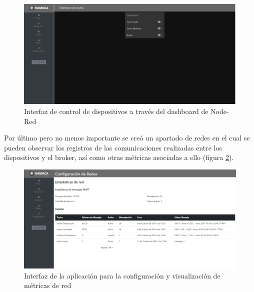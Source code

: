 \begin{figure}[!htb]
\centering
\includegraphics[scale=0.2]{./Figuras/hamaca_home.png}
\caption{Interfaz de control de dispositivos a través del dashboard de Node-Red}
\label{fig:hamaca_home}
\vspace*{-10pt}
\end{figure}

Por último pero no menos importante se creó un apartado de redes en el cual se pueden observar los registros de las comunicaciones realizadas entre los dispositivos y el broker, así como otras métricas asociadas a ello (figura \ref{fig:hamaca_redes}).

\begin{figure}[!htb]
\centering
\includegraphics[scale=0.2]{./Figuras/hamaca_redes.png}
\caption{Interfaz de la aplicación para la configuración y visualización de métricas de red}
\label{fig:hamaca_redes}
\vspace*{-10pt}
\end{figure}

